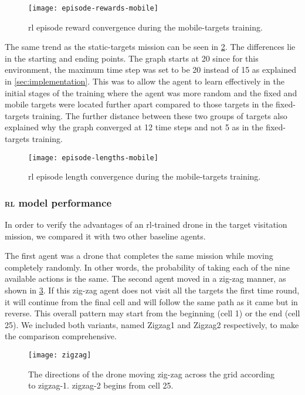 \documentclass[../main.tex]{subfiles}
\begin{document}
\begin{figure}[!t]
	\centering
	\texttt{[image: episode-rewards-mobile]}
        \caption{\gls{rl} episode reward convergence during the
        mobile-targets training.}
        \label{fig:episode-rewards-mobile}
\end{figure}

The same trend as the static-targets mission can be seen in
\cref{fig:episode-lengths-mobile}.
The differences lie in the starting and ending points.
The graph starts at 20 since for this environment, the maximum
time step was set to be 20 instead of 15 as explained in
\cref{sec:implementation}.
This was to allow the agent to learn effectively in the initial
stages of the training where the agent was more random and the fixed
and mobile targets were located further apart compared to those targets
in the fixed-targets training.
The further distance between these two groups of targets also explained
why the graph converged at 12 time steps and not 5 as in the
fixed-targets training.

\begin{figure}[!t]
	\centering
	\texttt{[image: episode-lengths-mobile]}
        \caption{\gls{rl} episode length convergence during the
        mobile-targets training.}
        \label{fig:episode-lengths-mobile}
\end{figure}

\subsubsection{\textsc{rl} model performance}

In order to verify the advantages of an \gls{rl}-trained drone
in the target visitation mission, we compared it with
two other baseline agents.

The first agent was a drone that completes the same mission 
while moving completely randomly. 
In other words, the probability of taking each of the 
nine available actions is the same.
The second agent moved in a zig-zag manner, as shown
in \cref{fig:zigzag}.
If this zig-zag agent does not visit all the targets the first time
round, it will continue from the final cell and will follow the same
path as it came but in reverse.
This overall pattern may start from the beginning (cell 1) or 
the end (cell 25).
We included both variants, named Zigzag1 and Zigzag2
respectively, to make the comparison comprehensive.

\begin{figure}[!t]
	\centering
	\texttt{[image: zigzag]}
	\caption{The directions of the drone moving zig-zag
		across the grid according to zigzag-1.
                zigzag-2 begins from cell 25.}
	\label{fig:zigzag}
\end{figure}
\end{document}
